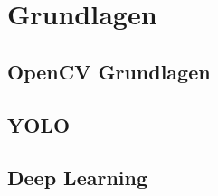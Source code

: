 \chapter{Grundlagen}
\label{cha:Grundlagen}

\section{OpenCV Grundlagen}
\section{YOLO}



\section{Deep Learning}